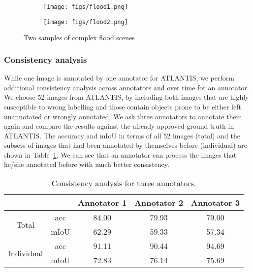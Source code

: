 \documentclass{article}
\begin{document}
\iffalse
\begin{figure}[htbp]
	\centering
	\texttt{[image: figs/annotation\_time.pdf]}
    \vspace{-5pt}
	\caption{Average time for annotation of one image in terms of different labels.}
	\vspace{-0pt}
	\label{fig:anntime}
\end{figure}
\fi

\begin{figure}[htbp]
    \centering
    \begin{subfigure}[b]{0.595\columnwidth}
        \centering
        \texttt{[image: figs/flood1.png]}
\label{sfig:flood1}
    \end{subfigure}
    \begin{subfigure}[b]{0.385\columnwidth}
        \centering
        \texttt{[image: figs/flood2.png]}
\label{sfig:flood2}
    \end{subfigure}
	\vspace{-1em}
    \caption{Two samples of complex flood scenes}
    \label{fig:flood-scene}
\end{figure}

\subsubsection{Consistency analysis}
While one image is annotated by one annotator for ATLANTIS, we perform additional consistency analysis across annotators and over time for an annotator. We choose 52 images from ATLANTIS, by including both images that are highly susceptible to wrong labelling and those contain objects prone to be either left unannotated or wrongly annotated. We ask three annotators to annotate them again and compare the results against the already approved ground truth in ATLANTIS. The accuracy and mIoU in terms of all 52 images (total) and the subsets of images that had been annotated by themselves before (individual) are shown in Table~\ref{tab:inconsistency_results}. We can see that an annotator can process the images that he/she annotated before with much better consistency. 

\begin{table}[h]
	\centering
	\caption{Consistency analysis for three annotators.}
	\label{tab:inconsistency_results}
\begin{tabular}{cc|c|c|c}
		\hline
		& & Annotator 1 & Annotator 2 & Annotator 3 \\
		\hline
		\multirow{2}{*}{Total} 
		& acc & 84.00  & 79.93 & 79.00 \\
		& mIoU & 62.29 & 59.33 & 57.34  \\
		\hline
		\multirow{2}{*}{Individual} 
		& acc & 91.11 & 90.44  & 94.69  \\
		& mIoU & 72.83  & 76.14 & 75.69  \\
		\hline
	\end{tabular}
\end{table}
\end{document}
